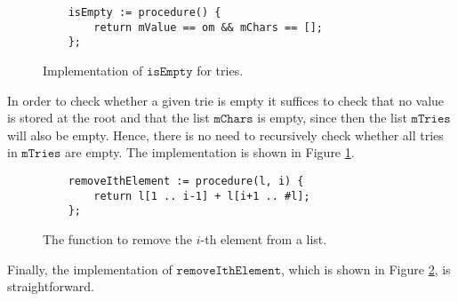 \begin{figure}[!ht]
\centering
\begin{verbatim}
    isEmpty := procedure() {
        return mValue == om && mChars == [];
    };
\end{verbatim}
\vspace*{-0.3cm}
\caption{Implementation of $\texttt{isEmpty}$ for tries.}
\label{fig:trie.ipython-isEmpty}
\end{figure}

In order to check whether a given trie is empty it suffices to check that no value is stored at the root
and that the list $\texttt{mChars}$ is empty, since then the list $\texttt{mTries}$ will also be empty.  Hence,
there is no need to recursively check whether all tries in $\texttt{mTries}$ are empty.  
The implementation is shown in Figure \ref{fig:trie.ipython-isEmpty}.

\begin{figure}[!ht]
\centering
\begin{verbatim}
    removeIthElement := procedure(l, i) {
        return l[1 .. i-1] + l[i+1 .. #l];
    };
\end{verbatim}
\vspace*{-0.3cm}
\caption{The function to remove the $i$-th element from a list.}
\label{fig:trie.ipython-removeIthElement}
\end{figure}

Finally, the implementation of $\texttt{removeIthElement}$, which is shown in Figure
\ref{fig:trie.ipython-removeIthElement}, is straightforward. 

